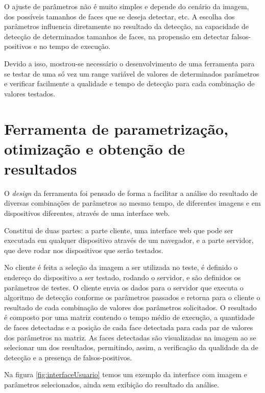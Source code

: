 O ajuste de parâmetros não é muito simples e depende do cenário da imagem, dos possíveis tamanhos de faces que se deseja detectar, etc. A escolha dos parâmetros influencia diretamente no resultado da detecção, na capacidade de detecção de determinados tamanhos de faces, na propensão em detectar falsos-positivos e no tempo de execução.

Devido a isso, mostrou-se necessário o desenvolvimento de uma ferramenta para se testar de uma só vez um range variável de valores de determinados parâmetros e verificar facilmente a qualidade e tempo de detecção para cada combinação de valores testados. 

\section{Ferramenta de parametrização, otimização e obtenção de resultados}

O \textit{design} da ferramenta foi pensado de forma a facilitar a análise do resultado de diversas combinações de parâmetros ao mesmo tempo, de diferentes imagens e em dispositivos diferentes, através de uma interface web.

Constitui de duas partes: a parte cliente, uma interface web que pode ser executada em qualquer dispositivo através de um navegador, e a parte servidor, que deve rodar nos dispositivos que serão testados.

No cliente é feita a seleção da imagem a ser utilizada no teste, é definido o endereço do dispositivo a ser testado, rodando o servidor, e são definidos os parâmetros de testes. O cliente envia os dados para o servidor que executa o algoritmo de detecção conforme os parâmetros passados e retorna para o cliente o resultado de cada combinação de valores dos parâmetros solicitados. O resultado é composto por uma matriz contendo o tempo médio de execução, a quantidade de faces detectadas e a posição de cada face detectada para cada par de valores dos parâmetros na matriz. As faces detectadas são visualizadas na imagem ao se selecionar um dos resultados, permitindo, assim, a verificação da qualidade da de detecção e a presença de falsos-positivos.

Na figura \ref{fig:interfaceUsuario} temos um exemplo da interface com imagem e parâmetros selecionados, ainda sem exibição do resultado da análise.

